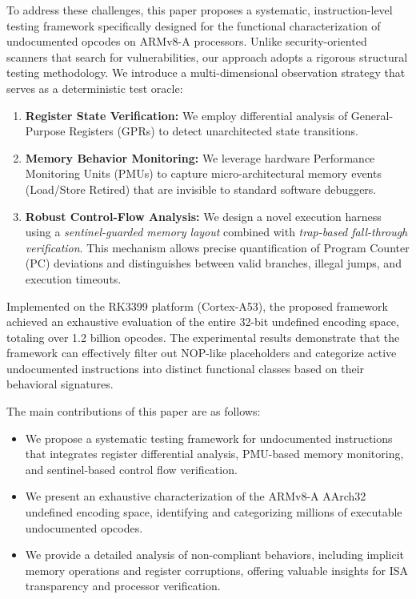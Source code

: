 \documentclass[pdflatex,sn-mathphys]{sn-jnl}%
\theoremstyle{thmstyleone}%
\theoremstyle{thmstyletwo}%
\theoremstyle{thmstylethree}%
\begin{document}
To address these challenges, this paper proposes a systematic, instruction-level testing framework specifically designed for the functional characterization of undocumented opcodes on ARMv8-A processors. Unlike security-oriented scanners that search for vulnerabilities, our approach adopts a rigorous structural testing methodology. We introduce a multi-dimensional observation strategy that serves as a deterministic test oracle:
\begin{enumerate}
    \item \textbf{Register State Verification:} We employ differential analysis of General-Purpose Registers (GPRs) to detect unarchitected state transitions.
    \item \textbf{Memory Behavior Monitoring:} We leverage hardware Performance Monitoring Units (PMUs) to capture micro-architectural memory events (Load/Store Retired) that are invisible to standard software debuggers.
    \item \textbf{Robust Control-Flow Analysis:} We design a novel execution harness using a \textit{sentinel-guarded memory layout} combined with \textit{trap-based fall-through verification}. This mechanism allows precise quantification of Program Counter (PC) deviations and distinguishes between valid branches, illegal jumps, and execution timeouts.
\end{enumerate}

Implemented on the RK3399 platform (Cortex-A53), the proposed framework achieved an exhaustive evaluation of the entire 32-bit undefined encoding space, totaling over 1.2 billion opcodes. The experimental results demonstrate that the framework can effectively filter out NOP-like placeholders and categorize active undocumented instructions into distinct functional classes based on their behavioral signatures.

The main contributions of this paper are as follows:
\begin{itemize}
    \item We propose a systematic testing framework for undocumented instructions that integrates register differential analysis, PMU-based memory monitoring, and sentinel-based control flow verification.
    \item We present an exhaustive characterization of the ARMv8-A AArch32 undefined encoding space, identifying and categorizing millions of executable undocumented opcodes.
    \item We provide a detailed analysis of non-compliant behaviors, including implicit memory operations and register corruptions, offering valuable insights for ISA transparency and processor verification.
\end{itemize}
\end{document}
